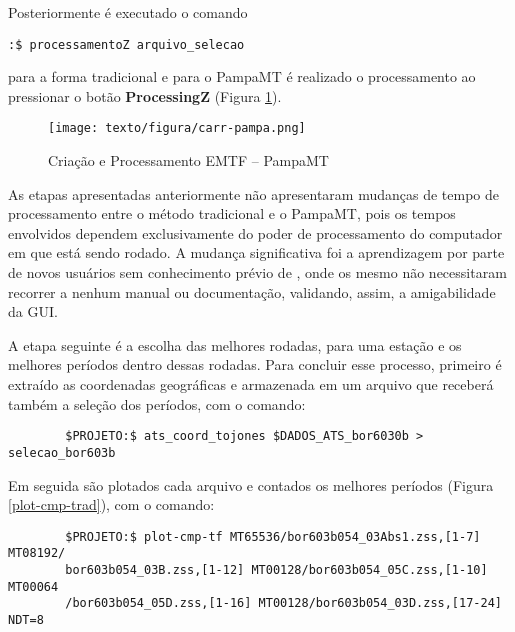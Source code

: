     Posteriormente é executado o comando \begin{footnotesize}\verb|:$ processamentoZ arquivo_selecao|\end{footnotesize} para a forma tradicional e para o PampaMT é realizado o processamento ao pressionar o botão \textbf{ProcessingZ} (Figura \ref{carr-pampa}).
    
    \begin{figure}[H]
        \caption{Criação e Processamento EMTF -- PampaMT}
            \begin{center}
                \texttt{[image: texto/figura/carr-pampa.png]}
            \end{center}
        \legend{\Fonte{\oautor}}
        \label{carr-pampa}
    \end{figure}
    
    As etapas apresentadas anteriormente não apresentaram mudanças de tempo de processamento entre o método tradicional e o PampaMT, pois os tempos envolvidos dependem exclusivamente do poder de processamento do computador em que está sendo rodado. A mudança significativa foi a aprendizagem por parte de novos usuários sem conhecimento prévio de , onde os mesmo não necessitaram recorrer a nenhum manual ou documentação, validando, assim, a amigabilidade da GUI. 
    
    A etapa seguinte é a escolha das melhores rodadas, para uma estação e os melhores períodos dentro dessas rodadas. Para concluir esse processo, primeiro é extraído as coordenadas geográficas e armazenada em um arquivo que receberá também a seleção dos períodos, com o comando:
    
        \begin{footnotesize}        
\begin{verbatim}
        $PROJETO:$ ats_coord_tojones $DADOS_ATS_bor6030b > selecao_bor603b
\end{verbatim}
\end{footnotesize}

    \noindent Em seguida são plotados cada arquivo  e contados os melhores períodos (Figura \ref{plot-cmp-trad}), com o comando:
    
    \begin{footnotesize}        
\begin{verbatim}
        $PROJETO:$ plot-cmp-tf MT65536/bor603b054_03Abs1.zss,[1-7] MT08192/
        bor603b054_03B.zss,[1-12] MT00128/bor603b054_05C.zss,[1-10] MT00064
        /bor603b054_05D.zss,[1-16] MT00128/bor603b054_03D.zss,[17-24] NDT=8
\end{verbatim}
\end{footnotesize}
    
